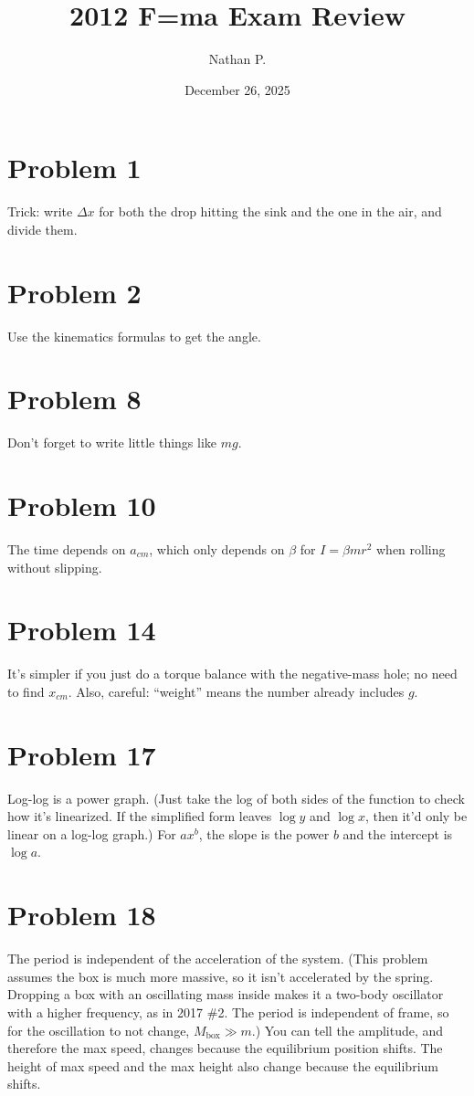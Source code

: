 \documentclass[11pt]{article}
\title{2012 F=ma Exam Review}
\author{Nathan P.}
\date{December 26, 2025}
\begin{document}
\maketitle

\section*{Problem 1}
Trick: write $\Delta x$ for both the drop hitting the sink and the one in the air, and divide them.

\section*{Problem 2}
Use the kinematics formulas to get the angle.

\section*{Problem 8}
Don't forget to write little things like $mg$.

\section*{Problem 10}
The time depends on $a_{cm}$, which only depends on $\beta$ for $I=\beta mr^2$ when rolling without slipping.

\section*{Problem 14}
It's simpler if you just do a torque balance with the negative-mass hole; no need to find $x_{cm}$.
Also, careful: ``weight'' means the number already includes $g$.

\section*{Problem 17}
Log-log is a power graph. (Just take the log of both sides of the function to check how it's linearized. If the simplified form leaves $\log y$ and $\log x$, then it'd only be linear on a log-log graph.)
For $ax^b$, the slope is the power $b$ and the intercept is $\log a$.

\section*{Problem 18}
The period is independent of the acceleration of the system.
(This problem assumes the box is much more massive, so it isn't accelerated by the spring. Dropping a box with an oscillating mass inside makes it a two-body oscillator with a higher frequency, as in 2017 \#2. The period is independent of frame, so for the oscillation to not change, $M_{\text{box}}\gg m$.)
You can tell the amplitude, and therefore the max speed, changes because the equilibrium position shifts.
The height of max speed and the max height also change because the equilibrium shifts.
\end{document}
